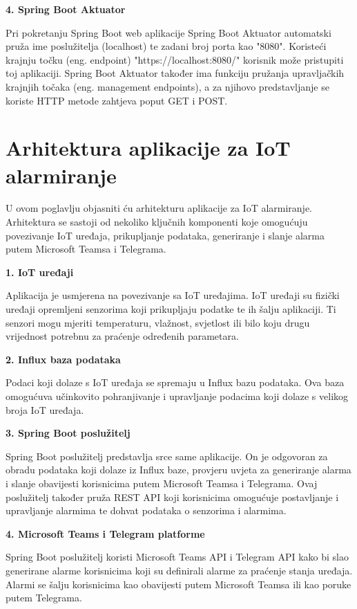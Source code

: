 \documentclass[times, utf8, zavrsni]{fer}
\begin{document}
 \textbf{4. Spring Boot Aktuator} 
 
  Pri pokretanju Spring Boot web aplikacije Spring Boot Aktuator automatski pruža ime poslužitelja (localhost) te zadani broj porta kao "8080". Koristeći krajnju točku (eng. endpoint)  "https://localhost:8080/" korisnik može pristupiti toj aplikaciji. Spring Boot Aktuator također ima funkciju pružanja upravljačkih krajnjih točaka (eng. management endpoints), a za njihovo predstavljanje se koriste HTTP metode zahtjeva poput GET i POST. 

\newpage
\section{ Arhitektura aplikacije za IoT alarmiranje}
U ovom poglavlju objasniti ću arhitekturu aplikacije za IoT alarmiranje. Arhitektura se sastoji od nekoliko ključnih komponenti koje omogućuju povezivanje IoT uređaja, prikupljanje podataka, generiranje i slanje alarma putem Microsoft Teamsa i Telegrama.


\textbf{1. IoT uređaji}

Aplikacija je usmjerena na povezivanje sa IoT uređajima. IoT uređaji su fizički uređaji opremljeni senzorima koji prikupljaju podatke te ih  šalju aplikaciji. Ti senzori mogu mjeriti temperaturu, vlažnost, svjetlost ili bilo koju drugu vrijednost potrebnu za praćenje određenih parametara.

\textbf{2. Influx baza podataka}

Podaci koji dolaze s IoT uređaja se spremaju u Influx bazu podataka. Ova baza omogućuva učinkovito pohranjivanje i upravljanje podacima koji dolaze s velikog broja IoT uređaja.

\textbf{3. Spring Boot poslužitelj}

Spring Boot poslužitelj predstavlja srce same aplikacije. On je odgovoran za obradu podataka koji dolaze iz Influx baze, provjeru uvjeta za generiranje alarma i slanje obavijesti korisnicima putem Microsoft Teamsa i Telegrama. Ovaj poslužitelj također pruža REST API koji korisnicima omogućuje postavljanje i upravljanje alarmima te dohvat podataka o senzorima i alarmima.

\textbf{4. Microsoft Teams i Telegram platforme}

Spring Boot poslužitelj koristi Microsoft Teams API i Telegram API kako bi slao generirane alarme korisnicima koji su definirali alarme za praćenje stanja uređaja. Alarmi se šalju korisnicima kao obavijesti putem Microsoft Teamsa ili kao poruke putem Telegrama.
\end{document}

